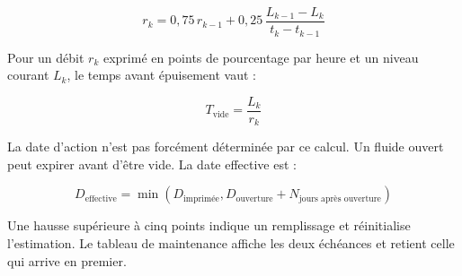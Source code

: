 \begin{equation}
r_k = 0{,}75\,r_{k-1} + 0{,}25\,
      \frac{L_{k-1}-L_k}{t_k-t_{k-1}}
\end{equation}

Pour un débit $r_k$ exprimé en points de pourcentage par heure et un niveau
courant $L_k$, le temps avant épuisement vaut :

\begin{equation}
T_{\text{vide}} = \frac{L_k}{r_k}
\end{equation}

La date d'action n'est pas forcément déterminée par ce calcul. Un fluide ouvert
peut expirer avant d'être vide. La date effective est :

\begin{equation}
D_{\text{effective}} =
\min\left(D_{\text{imprimée}},
D_{\text{ouverture}} + N_{\text{jours après ouverture}}\right)
\end{equation}

Une hausse supérieure à cinq points indique un remplissage et réinitialise
l'estimation. Le tableau de maintenance affiche les deux échéances et retient
celle qui arrive en premier.
